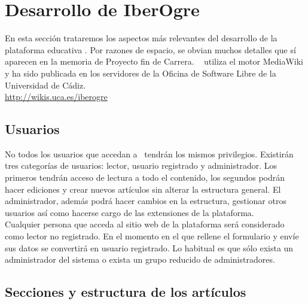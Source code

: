 \documentclass[a4paper,11pt]{article}
\begin{document}


\section{Desarrollo de IberOgre}

\noindent En esta sección trataremos los aspectos más relevantes del
desarrollo de la plataforma educativa \wiki. Por razones de espacio, se
obvian muchos detalles que sí aparecen en la memoria de Proyecto fin de Carrera.
\wiki\ \cite{website:iberogre} utiliza el motor MediaWiki \cite{website:mediawiki}
y ha sido publicada en los servidores de la
Oficina de Software Libre de la Universidad de Cádiz.\\

\url{http://wikis.uca.es/iberogre}\\

\subsection{Usuarios}

\noindent No todos los usuarios que accedan a \wiki\ tendrán los mismos privilegios.
Existirán tres categorías de usuarios: lector, usuario registrado y administrador.
Los primeros tendrán acceso de lectura a todo el contenido, los segundos
podrán hacer ediciones y crear nuevos artículos sin alterar la estructura general.
El administrador, además podrá hacer cambios en la estructura, gestionar otros
usuarios así como hacerse cargo de las extensiones de la plataforma.\\

\noindent Cualquier persona que acceda al sitio web de la plataforma será considerado
como lector no registrado. En el momento en el que rellene el formulario
y envíe sus datos se convertirá en usuario registrado. Lo habitual es que
sólo exista un administrador del sistema o exista un grupo reducido de
administradores.\\

\subsection{Secciones y estructura de los artículos}
\end{document}
